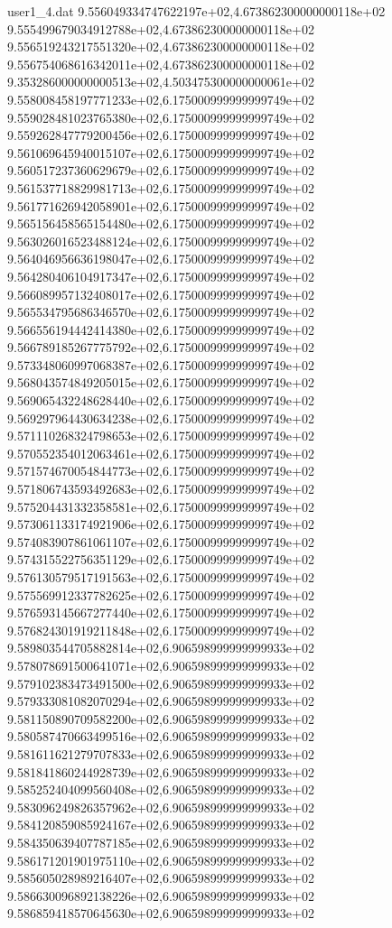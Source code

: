 \begin{filecontents}{user1_4.dat}
9.556049334747622197e+02,4.673862300000000118e+02
9.555499679034912788e+02,4.673862300000000118e+02
9.556519243217551320e+02,4.673862300000000118e+02
9.556754068616342011e+02,4.673862300000000118e+02
9.353286000000000513e+02,4.503475300000000061e+02
9.558008458197771233e+02,6.175000999999999749e+02
9.559028481023765380e+02,6.175000999999999749e+02
9.559262847779200456e+02,6.175000999999999749e+02
9.561069645940015107e+02,6.175000999999999749e+02
9.560517237360629679e+02,6.175000999999999749e+02
9.561537718829981713e+02,6.175000999999999749e+02
9.561771626942058901e+02,6.175000999999999749e+02
9.565156458565154480e+02,6.175000999999999749e+02
9.563026016523488124e+02,6.175000999999999749e+02
9.564046956636198047e+02,6.175000999999999749e+02
9.564280406104917347e+02,6.175000999999999749e+02
9.566089957132408017e+02,6.175000999999999749e+02
9.565534795686346570e+02,6.175000999999999749e+02
9.566556194442414380e+02,6.175000999999999749e+02
9.566789185267775792e+02,6.175000999999999749e+02
9.573348060997068387e+02,6.175000999999999749e+02
9.568043574849205015e+02,6.175000999999999749e+02
9.569065432248628440e+02,6.175000999999999749e+02
9.569297964430634238e+02,6.175000999999999749e+02
9.571110268324798653e+02,6.175000999999999749e+02
9.570552354012063461e+02,6.175000999999999749e+02
9.571574670054844773e+02,6.175000999999999749e+02
9.571806743593492683e+02,6.175000999999999749e+02
9.575204431332358581e+02,6.175000999999999749e+02
9.573061133174921906e+02,6.175000999999999749e+02
9.574083907861061107e+02,6.175000999999999749e+02
9.574315522756351129e+02,6.175000999999999749e+02
9.576130579517191563e+02,6.175000999999999749e+02
9.575569912337782625e+02,6.175000999999999749e+02
9.576593145667277440e+02,6.175000999999999749e+02
9.576824301919211848e+02,6.175000999999999749e+02
9.589803544705882814e+02,6.906598999999999933e+02
9.578078691500641071e+02,6.906598999999999933e+02
9.579102383473491500e+02,6.906598999999999933e+02
9.579333081082070294e+02,6.906598999999999933e+02
9.581150890709582200e+02,6.906598999999999933e+02
9.580587470663499516e+02,6.906598999999999933e+02
9.581611621279707833e+02,6.906598999999999933e+02
9.581841860244928739e+02,6.906598999999999933e+02
9.585252404099560408e+02,6.906598999999999933e+02
9.583096249826357962e+02,6.906598999999999933e+02
9.584120859085924167e+02,6.906598999999999933e+02
9.584350639407787185e+02,6.906598999999999933e+02
9.586171201901975110e+02,6.906598999999999933e+02
9.585605028989216407e+02,6.906598999999999933e+02
9.586630096892138226e+02,6.906598999999999933e+02
9.586859418570645630e+02,6.906598999999999933e+02

\end{filecontents}

